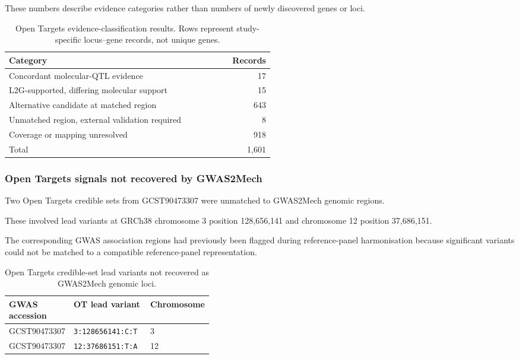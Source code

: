 \documentclass[11pt,a4paper]{article}
\begin{document}
These numbers describe evidence
categories rather than numbers of
newly discovered genes or loci.

\begin{table}[htbp]
\centering
\caption{
Open Targets evidence-classification results.
Rows represent study-specific locus--gene
records, not unique genes.
}
\label{tab:step13_gene_categories}
\small
\begin{tabular}{@{}p{0.68\linewidth}r@{}}
\toprule
Category & Records \\
\midrule
Concordant molecular-QTL evidence & 17 \\
L2G-supported, differing molecular support & 15 \\
Alternative candidate at matched region & 643 \\
Unmatched region, external validation required & 8 \\
Coverage or mapping unresolved & 918 \\
\midrule
Total & 1,601 \\
\bottomrule
\end{tabular}
\end{table}


\subsubsection{Open Targets signals not recovered by GWAS2Mech}

Two Open Targets credible sets from
GCST90473307 were unmatched to
GWAS2Mech genomic regions.

These involved lead variants at
GRCh38 chromosome 3 position
128,656,141 and chromosome 12
position 37,686,151.

The corresponding GWAS association
regions had previously been flagged
during reference-panel harmonisation
because significant variants could
not be matched to a compatible
reference-panel representation.

\begin{table}[htbp]
\centering
\caption{
Open Targets credible-set lead variants
not recovered as GWAS2Mech genomic loci.
}
\label{tab:step13_unmatched_ot}
\small
\begin{tabular}{@{}lp{0.4\linewidth}l@{}}
\toprule
GWAS accession & OT lead variant & Chromosome \\
\midrule
GCST90473307 &
\texttt{3:128656141:C:T} & 3 \\
GCST90473307 &
\texttt{12:37686151:T:A} & 12 \\
\bottomrule
\end{tabular}
\end{table}
\end{document}
